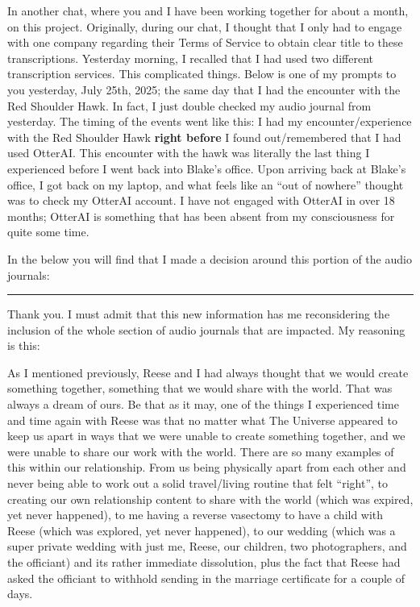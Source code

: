 \documentclass{article}
\begin{document}
In another chat, where you and I have been working together for about a
month, on this project. Originally, during our chat, I thought that I
only had to engage with one company regarding their Terms of Service to
obtain clear title to these transcriptions. Yesterday morning, I
recalled that I had used two different transcription services. This
complicated things. Below is one of my prompts to you yesterday, July
25th, 2025; the same day that I had the encounter with the Red Shoulder
Hawk. In fact, I just double checked my audio journal from yesterday.
The timing of the events went like this: I had my encounter/experience
with the Red Shoulder Hawk \textbf{right before} I found out/remembered
that I had used OtterAI. This encounter with the hawk was literally the
last thing I experienced before I went back into Blake's office. Upon
arriving back at Blake's office, I got back on my laptop, and what feels
like an ``out of nowhere'' thought was to check my OtterAI account. I
have not engaged with OtterAI in over 18 months; OtterAI is something
that has been absent from my consciousness for quite some time.

In the below you will find that I made a decision around this portion of
the audio journals:

\begin{center}\rule{0.5\linewidth}{0.5pt}\end{center}

Thank you. I must admit that this new information has me reconsidering
the inclusion of the whole section of audio journals that are impacted.
My reasoning is this:

As I mentioned previously, Reese and I had always thought that we would
create something together, something that we would share with the world.
That was always a dream of ours. Be that as it may, one of the things I
experienced time and time again with Reese was that no matter what The
Universe appeared to keep us apart in ways that we were unable to create
something together, and we were unable to share our work with the world.
There are so many examples of this within our relationship. From us
being physically apart from each other and never being able to work out
a solid travel/living routine that felt ``right'', to creating our own
relationship content to share with the world (which was expired, yet
never happened), to me having a reverse vasectomy to have a child with
Reese (which was explored, yet never happened), to our wedding (which
was a super private wedding with just me, Reese, our children, two
photographers, and the officiant) and its rather immediate dissolution,
plus the fact that Reese had asked the officiant to withhold sending in
the marriage certificate for a couple of days.
\end{document}
